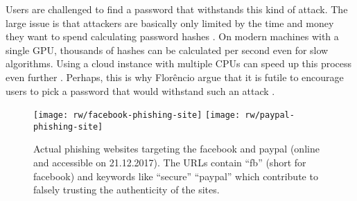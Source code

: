 Users are challenged to find a password that withstands this kind of attack. The large issue is that attackers are basically only limited by the time and money they want to spend calculating password hashes \cite{Block2017EconomicsOfflineCracking}. On modern machines with a single GPU, thousands of hashes can be calculated per second even for slow algorithms. Using a cloud instance with multiple CPUs can speed up this process even further . Perhaps, this is why Florêncio \etal argue that it is futile to encourage users to pick a password that would withstand such an attack \cite{Florencio2014AdministratorsGuide, Florencio2016CommACM}. 

\begin{figure}[h!]
	\centering
	\texttt{[image: rw/facebook-phishing-site]}
	\texttt{[image: rw/paypal-phishing-site]}
	\caption{\label{fig:rw:phishingsite} Actual phishing websites targeting the facebook and paypal (online and accessible on 21.12.2017). The URLs contain ``fb'' (short for facebook) and keywords like ``secure'' ``paypal'' which contribute to falsely trusting the authenticity of the sites.}
\end{figure}

